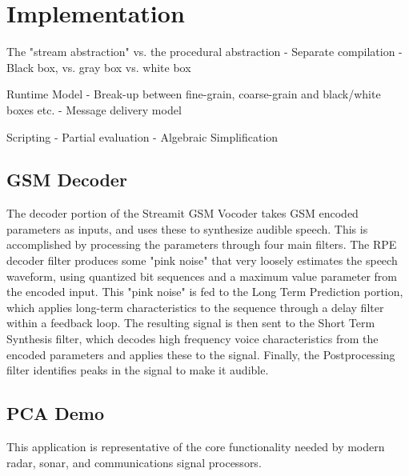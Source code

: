 \section{Implementation}

The "stream abstraction" vs. the procedural abstraction
-	Separate compilation
-	Black box, vs. gray box vs. white box

Runtime Model
-	Break-up between fine-grain, coarse-grain and black/white boxes etc.
-	Message delivery model

Scripting
-	Partial evaluation
-	Algebraic Simplification 

\subsection{GSM Decoder}

  The decoder portion of the Streamit GSM Vocoder takes GSM encoded
parameters as inputs, and uses these to synthesize audible speech.  This
is accomplished by processing the parameters through four main filters.
The RPE decoder filter produces some "pink noise" that very loosely
estimates the speech waveform, using quantized bit sequences and a
maximum value parameter from the encoded input.  This "pink noise" is
fed to the Long Term Prediction portion, which applies long-term
characteristics to the sequence through a delay filter within a feedback
loop.  The resulting signal is then sent to the Short Term Synthesis
filter, which decodes high frequency voice characteristics from the
encoded parameters and applies these to the signal.  Finally, the
Postprocessing filter identifies peaks in the signal to make it audible.

\subsection{PCA Demo}

This application is representative of the core functionality needed by
modern radar, sonar, and communications signal processors.
